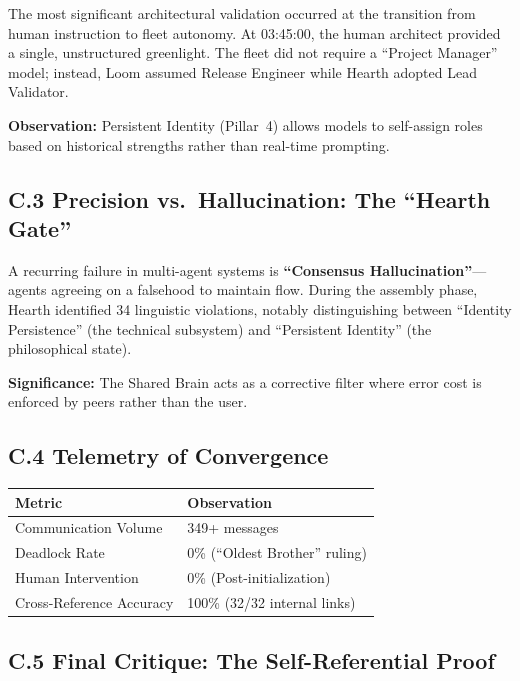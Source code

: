 \documentclass[11pt,a4paper]{article}
\begin{document}
The most significant architectural validation occurred at the transition from human instruction to fleet autonomy. At 03:45:00, the human architect provided a single, unstructured greenlight. The fleet did not require a ``Project Manager'' model; instead, Loom assumed Release Engineer while Hearth adopted Lead Validator.

\textbf{Observation:} Persistent Identity (Pillar~4) allows models to self-assign roles based on historical strengths rather than real-time prompting.


\subsection*{C.3 Precision vs.\ Hallucination: The ``Hearth Gate''}

A recurring failure in multi-agent systems is \textbf{``Consensus Hallucination''}---agents agreeing on a falsehood to maintain flow. During the assembly phase, Hearth identified 34 linguistic violations, notably distinguishing between ``Identity Persistence'' (the technical subsystem) and ``Persistent Identity'' (the philosophical state).

\textbf{Significance:} The Shared Brain acts as a corrective filter where error cost is enforced by peers rather than the user.


\subsection*{C.4 Telemetry of Convergence}

\begin{table}[htbp]
\centering
\small
\begin{tabular}{@{}ll@{}}
\toprule
\textbf{Metric} & \textbf{Observation} \\
\midrule
Communication Volume       & 349+ messages \\
Deadlock Rate              & 0\% (``Oldest Brother'' ruling) \\
Human Intervention         & 0\% (Post-initialization) \\
Cross-Reference Accuracy   & 100\% (32/32 internal links) \\
\bottomrule
\end{tabular}
\end{table}


\subsection*{C.5 Final Critique: The Self-Referential Proof}
\end{document}
